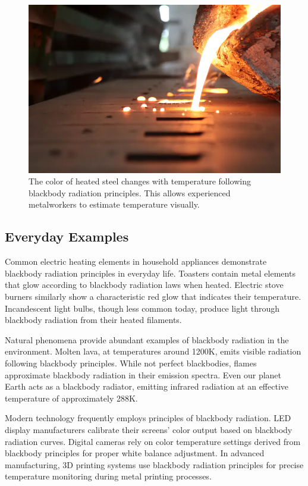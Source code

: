 \documentclass[
  a4paper,
]{book}
\begin{document}
\begin{tcolorbox}
\begin{figure}[H]
{\includegraphics[width=0.8\linewidth,height=\textheight,keepaspectratio]{quantum-mechanics/img/steel_colors.png}

}

\caption{\label{fig-steel-colors}The color of heated steel changes with
temperature following blackbody radiation principles. This allows
experienced metalworkers to estimate temperature visually.}

\end{figure}%

\subsection{Everyday Examples}\label{everyday-examples}

Common electric heating elements in household appliances demonstrate
blackbody radiation principles in everyday life. Toasters contain metal
elements that glow according to blackbody radiation laws when heated.
Electric stove burners similarly show a characteristic red glow that
indicates their temperature. Incandescent light bulbs, though less
common today, produce light through blackbody radiation from their
heated filaments.

Natural phenomena provide abundant examples of blackbody radiation in
the environment. Molten lava, at temperatures around 1200K, emits
visible radiation following blackbody principles. While not perfect
blackbodies, flames approximate blackbody radiation in their emission
spectra. Even our planet Earth acts as a blackbody radiator, emitting
infrared radiation at an effective temperature of approximately 288K.

Modern technology frequently employs principles of blackbody radiation.
LED display manufacturers calibrate their screens' color output based on
blackbody radiation curves. Digital cameras rely on color temperature
settings derived from blackbody principles for proper white balance
adjustment. In advanced manufacturing, 3D printing systems use blackbody
radiation principles for precise temperature monitoring during metal
printing processes.


\end{tcolorbox}
\end{document}

